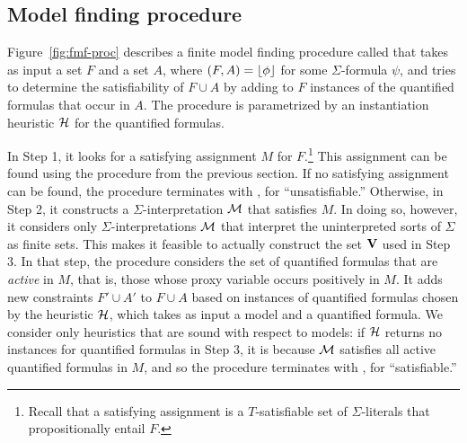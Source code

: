 \documentclass{svjour3}                     %
\begin{document}
\subsection*{Model finding procedure}

Figure~\ref{fig:fmf-proc} describes a finite model finding procedure called
\fmsolve 
that takes as input a set $F$ and a set $A$, where $(F, A) = \lfloor \phi \rfloor$ 
for some $\Sigma$-formula $\psi$, and 
tries to determine the satisfiability of $F \cup A$
by adding to $F$ instances of the quantified formulas that occur in $A$.
The procedure is parametrized by an instantiation heuristic $\mathcal{H}$ 
for the quantified formulas.

In Step 1, it looks for a satisfying assignment $M$ for $F$.\footnote{%
Recall that a satisfying assignment is a $T$-satisfiable set 
of $\Sigma$-literals that propositionally entail $F$.
}
This assignment can be found using the \dpllts procedure from the previous section.
If no satisfying assignment can be found, the procedure terminates 
with \unsat, for ``unsatisfiable.''
Otherwise, in Step 2, it constructs a $\Sigma$-interpretation $\mathcal{M}$ 
that satisfies $M$.
In doing so, however, it considers only $\Sigma$-interpretations $\mathcal{M}$ 
that interpret the uninterpreted sorts of $\Sigma$ as finite sets.
This makes it feasible to actually construct the set $\mathbf{V}$ used in Step 3.
In that step, the procedure considers the set of quantified formulas 
that are \emph{active} in $M$, that is, 
those whose proxy variable occurs positively in $M$.
It adds new constraints $F' \cup A'$ to $F \cup A$ based on instances 
of quantified formulas chosen by the heuristic $\mathcal{H}$, 
which takes as input a model and a quantified formula.
We consider only heuristics that are sound with respect to models: if $\mathcal{H}$ returns no instances for quantified formulas in Step 3,
it is because $\mathcal{M}$ satisfies all active quantified formulas in $M$, 
and so the procedure terminates with \sat, for ``satisfiable.''
\medskip
\end{document}
